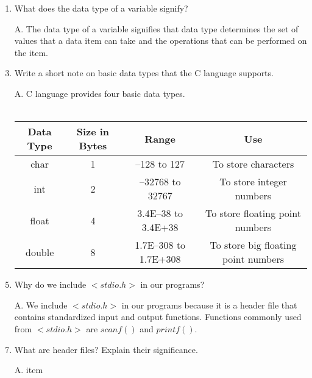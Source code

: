 \documentclass[fontsize=12pt,paper=a4]{book}
\begin{document}
\begin{enumerate}
 \item What does the data type of a variable signify?
 \item[A.]
       The data type of a variable signifies that data type determines the set of values that a data item can take and the operations that can be performed on the item.
       
 \item Write a short note on basic data types that the C language supports.
 \item[A.] C language provides four basic data types.\\\\
       \begin{tabular}{|c|c|c|c|}
        \hline
        Data Type & Size in Bytes & Range                & Use                                 \\
        \hline
        char      & 1             & –128 to 127          & To store characters                 \\
        int       & 2             & –32768 to 32767      & To store integer numbers            \\
        float     & 4             & 3.4E–38 to 3.4E+38   & To store floating point numbers     \\
        double    & 8             & 1.7E–308 to 1.7E+308 & To store big floating point numbers \\
        \hline
       \end{tabular}
       
 \item Why do we include $<stdio.h>$ in our programs?
 \item[A.]
       We include $<stdio.h>$ in our programs because it is a header file that contains standardized input and output functions. Functions commonly used from $<stdio.h>$ are $scanf()$ and $printf()$.
       
 \item What are header files? Explain their significance.
 \item[A.] item
       

\end{enumerate}
\end{document}
